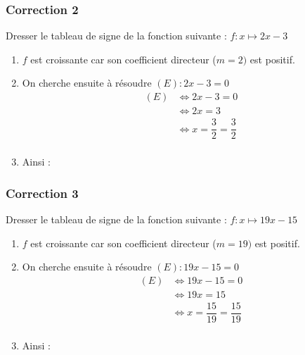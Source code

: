 \documentclass[15pt, mathserif]{beamer}
\begin{document}
\begin{frame}
\vspace{-10mm}
	\frametitle{Correction 2}
\vspace*{1cm} 
 \footnotesize{Dresser le tableau de signe de la fonction suivante : $ f:x\mapsto2x-3$} 
 \begin{enumerate} 
 \item $f$ est croissante car son coefficient directeur ($m=2)$ est positif.
 \item On cherche ensuite à résoudre  $(E) : 2x-3=0 $	 
 \begin{align*} (E)& \Leftrightarrow 2x-3=0\\
		 	 & \Leftrightarrow 2x=3\\
			 & \Leftrightarrow x= \dfrac{3}{2}=\dfrac{3}{2}\\
	 \end{align*} 
 \item Ainsi : \\ 
 \end{enumerate} 
 \end{frame}


\begin{frame}
\vspace{-10mm}
	\frametitle{Correction 3}
\vspace*{1cm} 
 \footnotesize{Dresser le tableau de signe de la fonction suivante : $ f:x\mapsto19x-15$} 
 \begin{enumerate} 
 \item $f$ est croissante car son coefficient directeur ($m=19)$ est positif.
 \item On cherche ensuite à résoudre  $(E) : 19x-15=0 $	 
 \begin{align*} (E)& \Leftrightarrow 19x-15=0\\
		 	 & \Leftrightarrow 19x=15\\
			 & \Leftrightarrow x= \dfrac{15}{19}=\dfrac{15}{19}\\
	 \end{align*} 
 \item Ainsi : \\ 
 \end{enumerate} 
 \end{frame}
\end{document}
